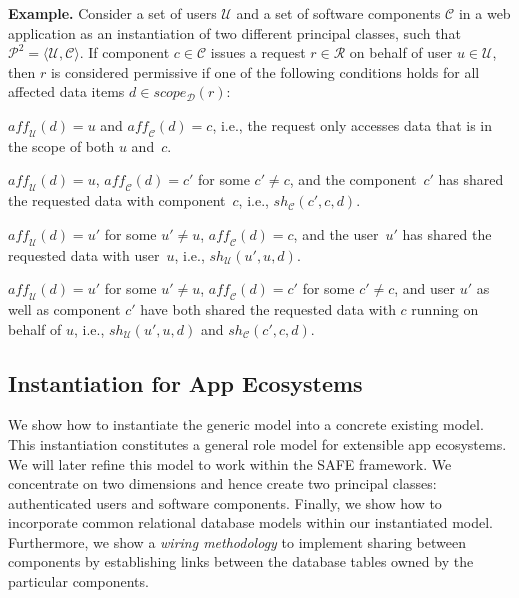 \documentclass{src/acm_proc_article-sp} \else
\newcommand\myparagraph[1]{\medskip\noindent\textbf{#1.}}
\newcommand\cC{\ensuremath{\mathcal{C}}\xspace}
\newcommand\cD{\ensuremath{\mathcal{D}}\xspace}
\newcommand\cP{\ensuremath{\mathcal{P}}\xspace}
\newcommand\cR{\ensuremath{\mathcal{R}}\xspace}
\newcommand\cU{\ensuremath{\mathcal{U}}\xspace}
\newcommand\SAFE{SAFE\xspace}
\begin{document}
\myparagraph{Example}
Consider a set of users \cU and a set of software components
\cC in a web application as an instantiation of two
different principal classes, such that $\cP^2 = \langle \cU,
\cC \rangle$.
If component $c \in \cC$ issues a request $r \in \cR$ on
behalf of user $u \in \cU$, then $r$ is considered
permissive if one of the following conditions holds for all
affected data items $d \in \mathit{scope_{\cD}(r)}$:
\vspace{-\parskip}
\begin{description}
  \setlength\itemsep{-1pt}

  \item[No sharing:] \vspace{-2mm}$\mathit{aff_{\cU}(d)} = u$ and
  $\mathit{aff_{\cC}(d)} = c$, i.e., the request only
  accesses data that is in the scope of both $u$ and~$c$.

  \item[Cross-\cC sharing:] $\mathit{aff_{\cU}(d)} = u$,
  $\mathit{aff_{\cC}(d)} = c'$ for some $c' \not= c$, and
  the component~$c'$ has shared the requested data with
  component~$c$, i.e., $sh_{\cC}(c', c, d)$.

  \item[Cross-\cU sharing:] $\mathit{aff_{\cU}(d)} = u'$ for some $u' \not= u$,
  $\mathit{aff_{\cC}(d)} = c$, and the user~$u'$ has shared
  the requested data with user~$u$, i.e., $sh_{\cU}(u', u,
  d)$.

  \item[Cross-\cU,\cC sharing:] $\mathit{aff_{\cU}(d)} = u'$
  for some $u' \not= u$, $\mathit{aff_{\cC}(d)} = c'$ for
  some $c' \not= c$, and user $u'$ as well as component $c'$
  have both shared the requested data with $c$ running on
  behalf of $u$, i.e., $sh_{\cU}(u', u, d)$ and
  $sh_{\cC}(c', c, d)$.

\end{description}



   \subsection{Instantiation for App Ecosystems}
\label{sec:instantiation}

We show how to instantiate the generic model into a
concrete existing model. This instantiation
constitutes a general role model for extensible app
ecosystems. We will later refine this model to work
within the \SAFE framework.
We concentrate on two dimensions and hence create two
principal classes: authenticated users and software
components.
Finally, we show how to incorporate common relational
database models within our instantiated model. Furthermore,
we show a \emph{wiring methodology} to implement sharing
between components by establishing links between the
database tables owned by the particular components.
\end{document}
